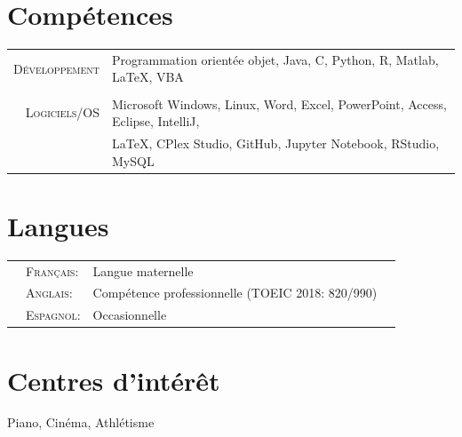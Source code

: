 \documentclass[a4paper,10pt]{article}
\begin{document}
\section{Compétences}
\begin{tabular}{rl}	
\textsc{Développement} & Programmation orientée objet, Java, C, Python, R, Matlab, \LaTeX, VBA\\&\\

\textsc{Logiciels/OS} & Microsoft Windows, Linux, Word, Excel, PowerPoint, Access, Eclipse, IntelliJ,\\& LaTeX, CPlex Studio, GitHub, Jupyter Notebook, RStudio, MySQL
\end{tabular}
\titlespacing{\section}{0pt}{1pt}{1pt}
\section{Langues}
\begin{flushleft}
\begin{tabular}{p{0.4cm}lll}
&\textsc{Français:}&Langue maternelle\\
&\textsc{Anglais:}&Compétence professionnelle (TOEIC 2018: 820/990)\\
&\textsc{Espagnol:}&Occasionnelle
\end{tabular}
\end{flushleft}

\section{Centres d'intérêt}
\begin{flushleft}
Piano, Cinéma, Athlétisme
\end{flushleft}

\end{document}
